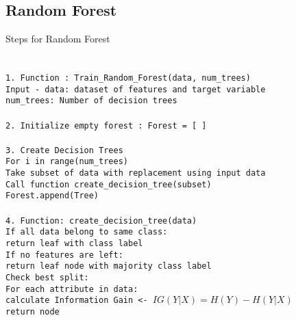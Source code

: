 \documentclass[10pt]{article}
\begin{document}
\subsection{{Random Forest}}
\noindent Steps for Random Forest
\texttt{\\\\\\
1. Function : Train\_Random\_Forest(data, num\_trees)\\
\hspace*{7em}Input - data: dataset of features and target variable\\
\hspace*{9em} num\_trees: Number of decision trees\\\\
2. Initialize empty forest : Forest = [ ]\\\\
3. Create Decision Trees\\
\hspace*{2em}For i in range(num\_trees)\\
\hspace*{3em}Take subset of data with replacement using input data\\
\hspace*{3em}Call function create\_decision\_tree(subset)\\
\hspace*{3em}Forest.append(Tree)\\\\
4. Function: create\_decision\_tree(data)\\
\hspace*{3em} If all data belong to same class:\\
\hspace*{5em} return leaf with class label\\
\hspace*{3em} If no features are left:\\
\hspace*{5em} return leaf node with majority class label\\
\hspace*{3em} Check best split:\\
\hspace*{5em} For each attribute in data:\\
\hspace*{7em} calculate Information Gain <- \(IG(Y|X) = H(Y) - H(Y|X)\) \\
\hspace*{5em} return node\\\\
}
\end{document}
